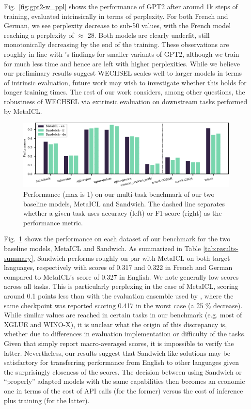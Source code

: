 \documentclass[11pt]{article}
\begin{document}
Fig.\@~\ref{fig:gpt2-w_ppl} shows the performance of GPT2 after around 1k steps of training,
evaluated intrinsically in terms of perplexity. For both French and German, we see perplexity
decrease to sub-50 values, with the French model reaching a perplexity of $\approx$ 28. Both models
are clearly underfit, still monotonically decreasing by the end of the training. These observations
are roughly in-line with \citet{minixhofer_wechsel_2022}'s findings for smaller variants of GPT2,
although we train for much less time and hence are left with higher perplexities. While we believe
our preliminary results suggest WECHSEL scales well to larger models in terms of intrinsic
evaluation, future work may wish to investigate whether this holds for longer training times. The
rest of our work considers, among other questions, the robustness of WECHSEL via extrinsic
evaluation on downstream tasks performed by MetaICL.

\begin{figure}[ht]
	\includegraphics{baselines.pdf}
	\caption{Performance (max is 1) on our multi-task benchmark of our two baseline models, MetaICL
		and Sandwich. The dashed line separates whether a given task uses accuracy (left) or F1-score
		(right) as the performance metric.}
	\label{fig:baselines}
\end{figure}

Fig.\@~\ref{fig:baselines} shows the performance on each dataset of our benchmark for the two
baseline models, MetaICL and Sandwich. As summarized in Table \ref{tab:results-summary}, Sandwich
performs roughly on par with MetaICL on both target languages, respectively with scores of 0.317 and
0.322 in French and German compared to MetaICL's score of 0.327 in English. We note generally low
scores across all tasks. This is particularly perplexing in the case of MetaICL, scoring around
0.1 points less than with the evaluation ensemble used by \citet{min_metaicl_2022}, where the same
checkpoint was reported scoring 0.417 in the worst case (a 25 \% decrease). While similar values
are reached in certain tasks in our benchmark (e.g. most of XGLUE and WINO-X), it is unclear what
the origin of this discrepancy is, whether due to differences in evaluation implementation or
difficulty of the tasks. Given that \citet{min_metaicl_2022} simply report macro-averaged scores,
it is impossible to verify the latter. Nevertheless, our results suggest that Sandwich-like
solutions may be satisfactory for transferring performance from English to other languages given
the surprisingly closeness of the scores. The decision between using Sandwich or ``properly''
adapted models with the same capabilities then becomes an economic one in terms of the cost of API
calls (for the former) versus the cost of inference plus training (for the latter).
\end{document}
